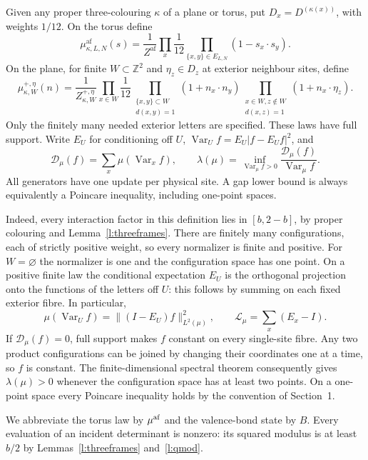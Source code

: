 \begin{definition}\label{d:framemodel}
Given any proper three-colouring \(\kappa\) of a plane or torus,
put \(D_x=D^{(\kappa(x))}\), with weights \(1/12\).
On the torus define
\[
 \mu^{\mathrm{af}}_{\kappa,L,N}(s)=
 \frac1{Z^{\mathrm{af}}}\prod_x\frac1{12}
       \prod_{\{x,y\}\in E_{L,N}}(1-s_x\cdot s_y).
\]
On the plane, for finite \(W\subset\mathbb Z^2\) and
\(\eta_z\in D_z\) at exterior neighbour sites, define
\[
 \mu^{+,\eta}_{\kappa,W}(n)=\frac1{Z^{+,\eta}_{\kappa,W}}
 \prod_{x\in W}\frac1{12}
 \prod_{\substack{\{x,y\}\subset W\\d(x,y)=1}}(1+n_x\cdot n_y)
 \prod_{\substack{x\in W,z\notin W\\d(x,z)=1}}(1+n_x\cdot\eta_z).
\]
Only the finitely many needed exterior letters are specified.
These laws have full support. Write \(E_U\) for conditioning off \(U\),
\(\operatorname{Var}_U f=E_U|f-E_Uf|^2\), and
\[
 \mathcal D_\mu(f)=\sum_x\mu(\operatorname{Var}_x f),\qquad
 \lambda(\mu)=\inf_{\operatorname{Var}_\mu f>0}
             \frac{\mathcal D_\mu(f)}{\operatorname{Var}_\mu f}.
\]
All generators have one update per physical site. A gap lower bound is
always equivalently a Poincare inequality, including one-point spaces.
\end{definition}

Indeed, every interaction factor in this definition lies in
\([b,2-b]\), by proper colouring and Lemma~\ref{l:threeframes}.
There are finitely many configurations, each of strictly positive
weight, so every normalizer is finite and positive. For
\(W=\varnothing\) the normalizer is one and the configuration
space has one point.
On a positive finite law the conditional expectation \(E_U\) is
the orthogonal projection onto the functions of the letters off
\(U\): this follows by summing on each fixed exterior fibre.
In particular,
\[
 \mu(\operatorname{Var}_U f)=\|(I-E_U)f\|_{L^2(\mu)}^2,
 \qquad \mathcal L_\mu=\sum_x(E_x-I).
\]
If \(\mathcal D_\mu(f)=0\), full support makes \(f\) constant
on every single-site fibre. Any two product configurations can be
joined by changing their coordinates one at a time, so \(f\) is
constant. The finite-dimensional spectral theorem consequently
gives \(\lambda(\mu)>0\) whenever the configuration space has
at least two points. On a one-point space every Poincare inequality
holds by the convention of Section~1.

We abbreviate the torus law by \(\mu^{\rm af}\) and the valence-bond
state by \(B\). Every evaluation of an incident determinant is
nonzero: its squared modulus is at least \(b/2\) by
Lemmas~\ref{l:threeframes} and~\ref{l:qmod}.

